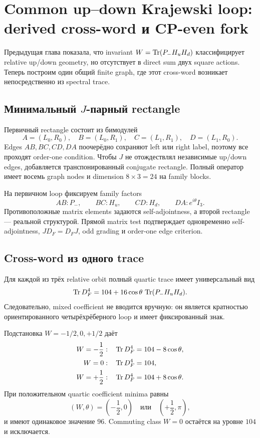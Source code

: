 \chapter{Common up--down Krajewski loop: derived cross-word и CP-even fork}

Предыдущая глава показала, что invariant
\(W=\operatorname{Tr}(P_-H_uH_d)\) классифицирует relative up/down geometry, но отсутствует
в direct sum двух square actions. Теперь построим один общий finite graph,
где этот cross-word возникает непосредственно из spectral trace.

\section{Минимальный \texorpdfstring{\(J\)}{J}-парный rectangle}

Первичный rectangle состоит из бимодулей
\begin{equation}
 A=(L_0,R_0),\quad B=(L_0,R_1),\quad
 C=(L_1,R_1),\quad D=(L_1,R_0).
\end{equation}
Edges \(AB,BC,CD,DA\) поочерёдно сохраняют left или right label, поэтому все
проходят order-one condition. Чтобы \(J\) не отождествлял независимые
up/down edges, добавляется транспонированный conjugate rectangle. Полный
оператор имеет восемь graph nodes и dimension \(8\times3=24\) на family
blocks.

На первичном loop фиксируем family factors
\begin{equation}
 AB:P_-,
 \qquad
 BC:H_u,
 \qquad
 CD:H_d,
 \qquad
 DA:e^{i\theta}I_3.
\end{equation}
Противоположные matrix elements задаются self-adjointness, а второй rectangle
--- реальной структурой. Прямой matrix test подтверждает одновременно
self-adjointness, \(JD_F=D_FJ\), odd grading и order-one edge criterion.

\section{Cross-word из одного trace}

Для каждой из трёх relative orbit полный quartic trace имеет универсальный
вид
\begin{equation}
 \operatorname{Tr} D_F^4
 =
 104+16\cos\theta\,\operatorname{Tr}(P_-H_uH_d).
\end{equation}
Следовательно, mixed coefficient не вводится вручную: он является
кратностью ориентированного четырёхрёберного loop и имеет фиксированный знак.

Подстановка \(W=-1/2,0,+1/2\) даёт
\begin{align}
 W=-\frac12:&\quad \operatorname{Tr} D_F^4=104-8\cos\theta,\\
 W=0:&\quad \operatorname{Tr} D_F^4=104,\\
 W=+\frac12:&\quad \operatorname{Tr} D_F^4=104+8\cos\theta.
\end{align}
При положительном quartic coefficient minima равны
\begin{equation}
 (W,\theta)=
 \left(-\frac12,0\right)
 \quad\text{или}\quad
 \left(+\frac12,\pi\right),
\end{equation}
и имеют одинаковое значение \(96\). Commuting class \(W=0\) остаётся на
уровне \(104\) и исключается.

